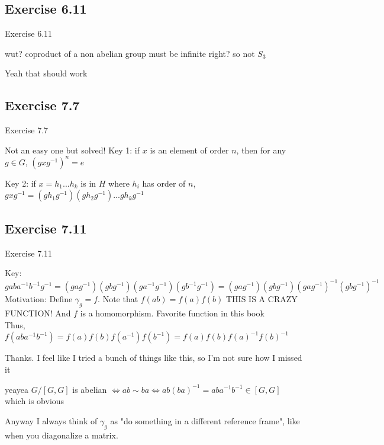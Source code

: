 \documentclass[15pt]{scrartcl}
\begin{document}
\subsection{Exercise 6.11}
\begin{discussion*}Exercise 6.11
    \begin{abboy*}
        wut? coproduct of a non abelian group must be infinite right? so not $S_3$ 
    \end{abboy*}
    \begin{evie*}
        Yeah that should work
    \end{evie*}
\end{discussion*}


\subsection{Exercise 7.7}
\begin{discussion*}Exercise 7.7
    \begin{abboy*}
        Not an easy one but solved!
        Key 1: if $x$ is an element of order $n$, then for any $g \in G$, $(gxg^{-1})^n=e$ 

        Key 2: if $x=h_1...h_k$ is in $H$ where $h_i$ has order of $n$, $gxg^{-1}=(gh_1g^{-1})(gh_2g^{-1})...gh_kg^{-1}$
    \end{abboy*}

\end{discussion*}


\subsection{Exercise 7.11}
\begin{discussion*}Exercise 7.11
    \begin{abboy*}
        Key: $gaba^{-1}b^{-1}g^{-1}=(gag^{-1})(gbg^{-1})(ga^{-1}g^{-1})(gb^{-1}g^{-1})=(gag^{-1})(gbg^{-1})(gag^{-1})^{-1}(gbg^{-1})^{-1}$
        \\
        Motivation: Define $\gamma_g=f$. Note that $f(ab)=f(a)f(b)$ THIS IS A CRAZY FUNCTION! And $f$ is a homomorphism. Favorite function in this book 
        \\
        Thus, $f(aba^{-1}b^{-1})=f(a)f(b)f(a^{-1})f(b^{-1})=f(a)f(b)f(a)^{-1}f(b)^{-1}$
    \end{abboy*}
    \begin{evie*}
        Thanks. I feel like I tried a bunch of things like this, so I'm not sure how I missed it
    \end{evie*}
    \begin{abboy*}
        yeayea
        $G/[G,G]$ is abelian $\Leftrightarrow  ab\sim ba \Leftrightarrow  ab(ba)^{-1}=aba^{-1}b^{-1} \in [G,G]$ which is obvious
    \end{abboy*}
    \begin{evie*}
        Anyway I always think of $\gamma_g$ as "do something in a different reference frame", like when you diagonalize a matrix.
    \end{evie*}

\end{discussion*}
\end{document}
